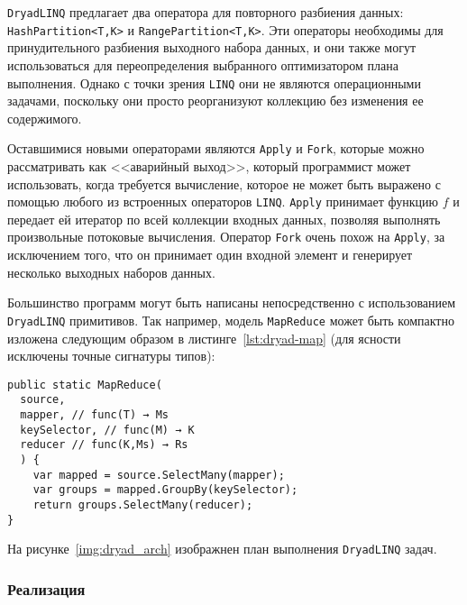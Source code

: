 \texttt{DryadLINQ} предлагает два оператора для повторного разбиения данных: \texttt{HashPartition<T,K>} и \texttt{RangePartition<T,K>}.
Эти операторы необходимы для принудительного разбиения выходного набора данных, и они также могут использоваться для переопределения выбранного оптимизатором плана выполнения. 
Однако с точки зрения \texttt{LINQ} они не являются операционными задачами, поскольку они просто реорганизуют коллекцию без изменения ее содержимого.

Оставшимися новыми операторами являются \texttt{Apply} и \texttt{Fork}, которые можно рассматривать как <<аварийный выход>>, который программист может использовать, когда требуется вычисление, которое не может быть выражено с помощью любого из встроенных операторов \texttt{LINQ}.
\texttt{Apply} принимает функцию $f$ и передает ей итератор по всей коллекции входных данных, позволяя выполнять произвольные потоковые вычисления. 
Оператор \texttt{Fork} очень похож на \texttt{Apply}, за исключением того, что он принимает один входной элемент и генерирует несколько выходных наборов данных.

Большинство программ могут быть написаны непосредственно с использованием \texttt{DryadLINQ} примитивов.
Так например, модель \texttt{MapReduce} может быть компактно изложена следующим образом в листинге~\ref{lst:dryad-map} (для ясности исключены точные сигнатуры типов):

\begin{center}
\captionsetup{justification=raggedright,singlelinecheck=off}
\begin{lstlisting}[label=lst:dryad-map,caption=\texttt{MapReduce} с использованием \texttt{DryadLINQ}]
public static MapReduce( 
  source, 
  mapper, // func(T) → Ms
  keySelector, // func(M) → K
  reducer // func(K,Ms) → Rs
  ) {
    var mapped = source.SelectMany(mapper);
    var groups = mapped.GroupBy(keySelector);
    return groups.SelectMany(reducer);
}

\end{lstlisting}
\end{center}

На рисунке~\ref{img:dryad_arch} изображнен план выполнения \texttt{DryadLINQ} задач.


\subsubsection{Реализация}

